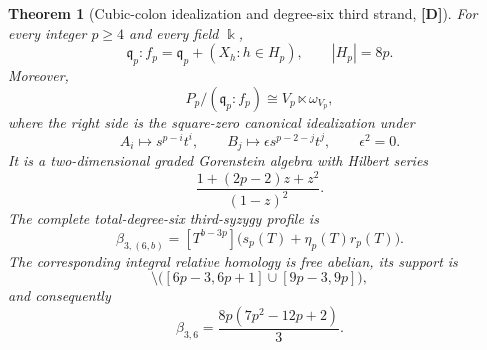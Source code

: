 \documentclass[11pt]{article}
\newtheorem{theorem}{Theorem}[section]
\theoremstyle{definition}
\theoremstyle{remark}
\newcommand{\kfield}{\Bbbk}
\begin{document}
\begin{theorem}[Cubic-colon idealization and degree-six third strand, {\bf[D]}]
\label{thm:colon-idealization-six}
For every integer $p\ge4$ and every field $\kfield$,
\begin{equation}
\mathfrak q_p:f_p=\mathfrak q_p+(X_h:h\in H_p),\qquad |H_p|=8p.\label{eq:complete-cubic-colon}
\end{equation}
Moreover,
\begin{equation}
P_p/(\mathfrak q_p:f_p)\cong V_p\ltimes\omega_{V_p},\label{eq:colon-idealization}
\end{equation}
where the right side is the square-zero canonical idealization under
\[
A_i\longmapsto s^{p-i}t^i,\qquad
B_j\longmapsto \epsilon s^{p-2-j}t^j,\qquad \epsilon^2=0.
\]
It is a two-dimensional graded Gorenstein algebra with Hilbert series
\[
\frac{1+(2p-2)z+z^2}{(1-z)^2}.
\]
The complete total-degree-six third-syzygy profile is
\begin{equation}
\beta_{3,(6,b)}=[T^{b-3p}]\bigl(s_p(T)+\eta_p(T)r_p(T)\bigr).\label{eq:degree-six-profile}
\end{equation}
The corresponding integral relative homology is free abelian, its support is
\begin{equation}
[3p+4,29p-5]\setminus\bigl([6p-3,6p+1]\cup[9p-3,9p]\bigr),\label{eq:degree-six-support}
\end{equation}
and consequently
\begin{equation}
\beta_{3,6}=\frac{8p(7p^2-12p+2)}{3}.\label{eq:beta-three-six}
\end{equation}
\end{theorem}
\end{document}
